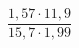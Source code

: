 \begin{ex}
	\begin{condition}
		\( \dfrac{1,57\cdot11,9}{15,7\cdot1,99} \)
	\end{condition}
\end{ex}